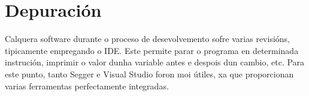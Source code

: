 \section{Depuración}\label{sec:depuración}
Calquera software durante o proceso de desevolvemento sofre varias revisións, tipicamente empregando o IDE. Este permite parar o programa en determinada instrución, imprimir o valor dunha variable antes e despois dun cambio, etc. Para este punto, tanto Segger e Visual Studio foron moi útiles, xa que proporcionan varias ferramentas perfectamente integradas.

